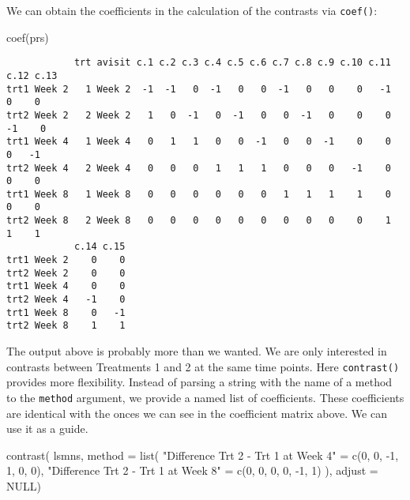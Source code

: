 \documentclass[
  letterpaper,
  DIV=11,
  numbers=noendperiod]{scrreprt}
\newenvironment{Shaded}{\begin{snugshade}}{\end{snugshade}}
\newcommand{\AttributeTok}[1]{\textcolor[rgb]{0.40,0.45,0.13}{#1}}
\newcommand{\ConstantTok}[1]{\textcolor[rgb]{0.56,0.35,0.01}{#1}}
\newcommand{\DecValTok}[1]{\textcolor[rgb]{0.68,0.00,0.00}{#1}}
\newcommand{\FunctionTok}[1]{\textcolor[rgb]{0.28,0.35,0.67}{#1}}
\newcommand{\NormalTok}[1]{\textcolor[rgb]{0.00,0.23,0.31}{#1}}
\newcommand{\OtherTok}[1]{\textcolor[rgb]{0.00,0.23,0.31}{#1}}
\newcommand{\SpecialCharTok}[1]{\textcolor[rgb]{0.37,0.37,0.37}{#1}}
\newcommand{\StringTok}[1]{\textcolor[rgb]{0.13,0.47,0.30}{#1}}
\begin{document}
We can obtain the coefficients in the calculation of the contrasts via
\texttt{coef()}:

\begin{Shaded}
\begin{Highlighting}[]
\FunctionTok{coef}\NormalTok{(prs)}
\end{Highlighting}
\end{Shaded}

\begin{verbatim}
            trt avisit c.1 c.2 c.3 c.4 c.5 c.6 c.7 c.8 c.9 c.10 c.11 c.12 c.13
trt1 Week 2   1 Week 2  -1  -1   0  -1   0   0  -1   0   0    0   -1    0    0
trt2 Week 2   2 Week 2   1   0  -1   0  -1   0   0  -1   0    0    0   -1    0
trt1 Week 4   1 Week 4   0   1   1   0   0  -1   0   0  -1    0    0    0   -1
trt2 Week 4   2 Week 4   0   0   0   1   1   1   0   0   0   -1    0    0    0
trt1 Week 8   1 Week 8   0   0   0   0   0   0   1   1   1    1    0    0    0
trt2 Week 8   2 Week 8   0   0   0   0   0   0   0   0   0    0    1    1    1
            c.14 c.15
trt1 Week 2    0    0
trt2 Week 2    0    0
trt1 Week 4    0    0
trt2 Week 4   -1    0
trt1 Week 8    0   -1
trt2 Week 8    1    1
\end{verbatim}

The output above is probably more than we wanted. We are only interested
in contrasts between Treatments 1 and 2 at the same time points. Here
\texttt{contrast()} provides more flexibility. Instead of parsing a
string with the name of a method to the \texttt{method} argument, we
provide a named list of coefficients. These coefficients are identical
with the onces we can see in the coefficient matrix above. We can use it
as a guide.

\begin{Shaded}
\begin{Highlighting}[]
\FunctionTok{contrast}\NormalTok{(}
\NormalTok{  lsmns, }
  \AttributeTok{method =} \FunctionTok{list}\NormalTok{(}
    \StringTok{"Difference Trt 2 {-} Trt 1 at Week 4"} \OtherTok{=} \FunctionTok{c}\NormalTok{(}\DecValTok{0}\NormalTok{, }\DecValTok{0}\NormalTok{, }\SpecialCharTok{{-}}\DecValTok{1}\NormalTok{, }\DecValTok{1}\NormalTok{, }\DecValTok{0}\NormalTok{, }\DecValTok{0}\NormalTok{),}
    \StringTok{"Difference Trt 2 {-} Trt 1 at Week 8"} \OtherTok{=} \FunctionTok{c}\NormalTok{(}\DecValTok{0}\NormalTok{, }\DecValTok{0}\NormalTok{, }\DecValTok{0}\NormalTok{, }\DecValTok{0}\NormalTok{, }\SpecialCharTok{{-}}\DecValTok{1}\NormalTok{, }\DecValTok{1}\NormalTok{)}
\NormalTok{  ), }
  \AttributeTok{adjust =} \ConstantTok{NULL}\NormalTok{)}
\end{Highlighting}
\end{Shaded}
\end{document}
